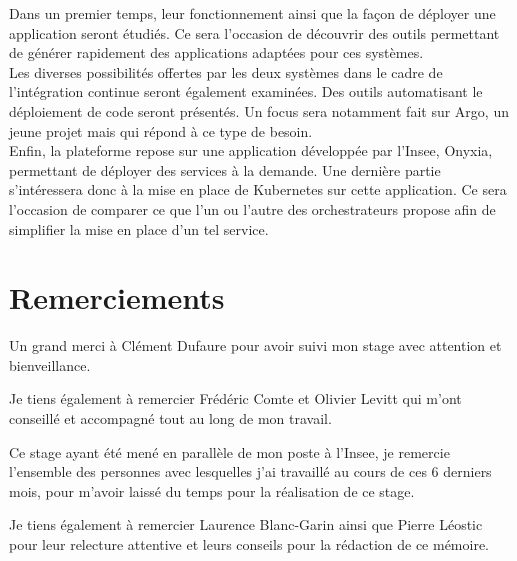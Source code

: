 \documentclass[11pt,fleqn]{book} %
\begin{document}
Dans un premier temps, leur fonctionnement ainsi que la façon de déployer une application seront étudiés. Ce sera l'occasion de découvrir des outils permettant de générer rapidement des applications adaptées pour ces systèmes.\\

Les diverses possibilités offertes par les deux systèmes dans le cadre de l'intégration continue seront également examinées. Des outils automatisant le déploiement de code seront présentés. Un focus sera notamment fait sur Argo, un jeune projet mais qui répond à ce type de besoin.\\

Enfin, la plateforme repose sur une application développée par l'Insee, Onyxia, permettant de déployer des services à la demande. Une dernière partie s'intéressera donc à la mise en place de Kubernetes sur cette application. Ce sera l'occasion de comparer ce que l'un ou l'autre des orchestrateurs propose afin de simplifier la mise en place d'un tel service.



\chapter*{Remerciements}
\vspace{-2cm}

Un grand merci à Clément Dufaure pour avoir suivi mon stage avec attention et bienveillance.\newline

Je tiens également à remercier Frédéric Comte et Olivier Levitt qui m’ont conseillé et accompagné tout au long de mon travail.  \newline

Ce stage ayant été mené en parallèle de mon poste à l’Insee, je remercie l'ensemble des personnes avec lesquelles j'ai travaillé au cours de ces 6 derniers mois, pour m'avoir laissé du temps pour la réalisation de ce stage.\newline

Je tiens également à remercier Laurence Blanc-Garin ainsi que Pierre Léostic pour leur relecture attentive et leurs conseils pour la rédaction de ce mémoire. 



\vspace{-3cm}
\tableofcontents %
\cleardoublepage %
\end{document}
